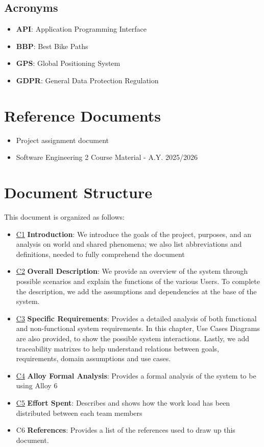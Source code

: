 \subsection{Acronyms}
\begin{itemize}
    \item \textbf{API}: Application Programming Interface
    \item \textbf{BBP}: Best Bike Paths
    \item \textbf{GPS}: Global Positioning System
    \item \textbf{GDPR}: General Data Protection Regulation
\end{itemize}

\section{Reference Documents}
\label{sec:references}
\begin{itemize}
    \item Project assignment document
    \item Software Engineering 2 Course Material - A.Y. 2025/2026
\end{itemize}

\section{Document Structure}
\label{sec:structure}
This document is organized as follows:
\begin{itemize}
    \item \hyperref[ch:introduction]{\color{bluepoli}C1} \color{black} \textbf{Introduction}: We introduce the goals of the project, purposes, and an analysis on world and shared phenomena; we also list abbreviations and definitions, needed to fully comprehend the document
    \item \hyperref[ch:overall]{\color{bluepoli}C2} \color{black} \textbf{Overall Description}: We provide an overview of the system through possible scenarios and explain the functions of the various Users. To complete the description, we add the assumptions and dependencies at the base of the system.
    \item \hyperref[ch:requirements]{\color{bluepoli}C3} \color{black} \textbf{Specific Requirements}: Provides a detailed analysis of both functional and non-functional system requirements. In this chapter, Use Cases Diagrams are also provided, to show the possible system interactions. Lastly, we add traceability matrixes to help understand relations between goals, requirements, domain assumptions and use cases.
    \item \hyperref[ch:alloy]{\color{bluepoli}C4} \color{black} \textbf{Alloy Formal Analysis}: Provides a formal analysis of the system to be using Alloy 6
    \item \hyperref[ch:effort]{\color{bluepoli}C5} \color{black} \textbf{Effort Spent}: Describes and shows how the work load has been distributed between each team members
    \item \color{bluepoli} C6 \color{black}\textbf{References}: Provides a list of the references used to draw up this document.
\end{itemize}


